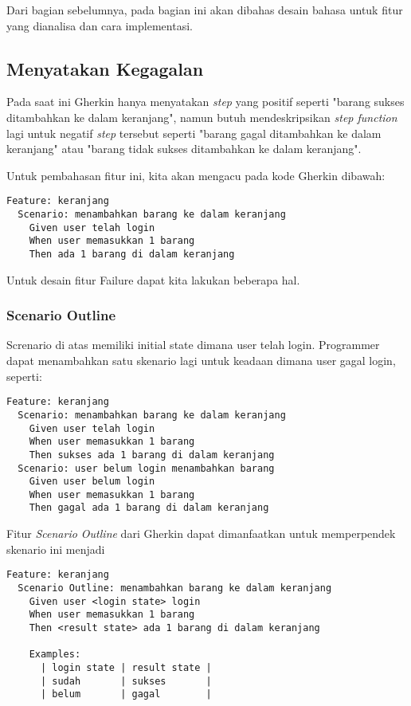 Dari bagian sebelumnya, pada bagian ini akan dibahas desain bahasa untuk fitur yang dianalisa
dan cara implementasi.

\subsection{Menyatakan Kegagalan}

Pada saat ini Gherkin hanya menyatakan \textit{step} yang positif seperti
"barang sukses ditambahkan ke dalam keranjang", namun butuh mendeskripsikan \textit{step function}
lagi untuk negatif \textit{step} tersebut seperti "barang gagal ditambahkan ke dalam keranjang" atau
"barang tidak sukses ditambahkan ke dalam keranjang".

Untuk pembahasan fitur ini, kita akan mengacu pada kode Gherkin dibawah:
\begin{lstlisting}[language=gherkin]
Feature: keranjang
  Scenario: menambahkan barang ke dalam keranjang
    Given user telah login
    When user memasukkan 1 barang
    Then ada 1 barang di dalam keranjang
\end{lstlisting}

Untuk desain fitur Failure dapat kita lakukan beberapa hal.

\subsubsection{Scenario Outline}
Screnario di atas memiliki initial state dimana user telah login.
Programmer dapat menambahkan satu skenario lagi untuk keadaan dimana user gagal login, seperti:
\begin{lstlisting}[language=gherkin]
Feature: keranjang
  Scenario: menambahkan barang ke dalam keranjang
    Given user telah login
    When user memasukkan 1 barang
    Then sukses ada 1 barang di dalam keranjang
  Scenario: user belum login menambahkan barang 
    Given user belum login
    When user memasukkan 1 barang
    Then gagal ada 1 barang di dalam keranjang
\end{lstlisting}

Fitur \textit{Scenario Outline} dari Gherkin dapat dimanfaatkan untuk memperpendek skenario ini menjadi

\begin{lstlisting}[language=gherkin]
Feature: keranjang
  Scenario Outline: menambahkan barang ke dalam keranjang
    Given user <login state> login
    When user memasukkan 1 barang
    Then <result state> ada 1 barang di dalam keranjang

    Examples:
      | login state | result state |
      | sudah       | sukses       |
      | belum       | gagal        |
\end{lstlisting}

